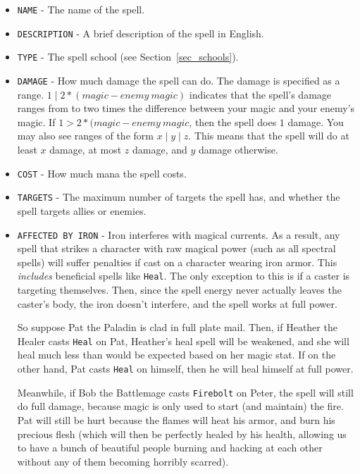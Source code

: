\documentclass{report}
\begin{document}
\begin{itemize}
    \item \verb|NAME| - The name of the spell.
    \item \verb|DESCRIPTION| - A brief description of the spell in English.
    \item \verb|TYPE| - The spell school (see Section~\ref{sec_schools}).
    \item \verb|DAMAGE| - How much damage the spell can do. The damage is specified
    as a range. $1 \mid 2*(\mathit{magic} - \mathit{enemy~magic})$ indicates that the
    spell's damage ranges from to two times the difference between your magic
    and your enemy's magic. If $1 > 2*(\mathit{magic} - \mathit{enemy~magic}$, then
    the spell does $1$ damage. You may also see ranges of the form
    $x \mid y \mid z$. This means that the spell will do at least $x$ damage, at most
    $z$ damage, and $y$ damage otherwise. 
    \item \verb|COST| - How much mana the spell costs.
    \item \verb|TARGETS| - The maximum number of targets the spell has, and whether the spell
    targets allies or enemies.
    \item \verb|AFFECTED BY IRON| - Iron interferes with magical currents. 
    As a result, any spell that strikes a character with raw magical power (such
    as all spectral spells) will suffer penalties if cast on a character wearing
    iron armor. This \emph{includes} beneficial spells like \verb|Heal|. The only
    exception to this is if a caster is targeting themselves. Then, since the 
    spell energy never actually leaves the caster's body, the iron doesn't 
    interfere, and the spell works at full power.

    So suppose Pat the Paladin is clad in full plate mail. Then, if Heather the 
    Healer casts \verb|Heal| on Pat, Heather's heal spell will be weakened, and she will
    heal much less than would be expected based on her magic stat. If on the
    other hand, Pat casts \verb|Heal| on himself, then he will heal himself at full
    power.

    Meanwhile, if Bob the Battlemage casts \verb|Firebolt| on Peter, the spell will still
    do full damage, because magic is only used to start (and maintain) the fire.
    Pat will still be hurt because the flames will heat his armor, and burn his
    precious flesh (which will then be perfectly healed by his health,
    allowing us to have a bunch of beautiful people burning and hacking at each
    other without any of them becoming horribly scarred).


\end{itemize}
\end{document}
